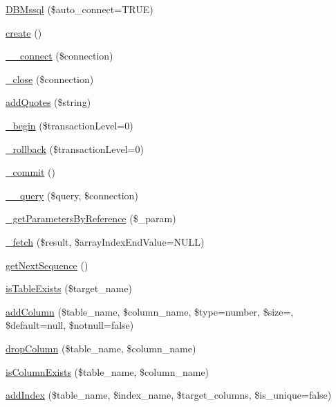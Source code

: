 \begin{DoxyCompactItemize}
\item 
\hyperlink{classDBMssql_ae74126db37fb85343806218896be4451}{D\+B\+Mssql} (\$auto\+\_\+connect=T\+R\+UE)
\item 
\hyperlink{classDBMssql_a1be3ce3432e43e0a5080ada450971345}{create} ()
\item 
\hyperlink{classDBMssql_a369f968ee79e1eb30e5d640c2294a7d1}{\+\_\+\+\_\+connect} (\$connection)
\item 
\hyperlink{classDBMssql_a64f2fc08d576cdcfc0dd3a80343a0e5a}{\+\_\+close} (\$connection)
\item 
\hyperlink{classDBMssql_ac380f1918abd17fd5cba28accfaec9fc}{add\+Quotes} (\$string)
\item 
\hyperlink{classDBMssql_ae44697dbc8dd678df78458a407e40c03}{\+\_\+begin} (\$transaction\+Level=0)
\item 
\hyperlink{classDBMssql_a35fd47dce4ad5dabbc3b994f5774afb7}{\+\_\+rollback} (\$transaction\+Level=0)
\item 
\hyperlink{classDBMssql_a08f359cc1c5ce91fde7139446252e8c4}{\+\_\+commit} ()
\item 
\hyperlink{classDBMssql_aa2d0d2f6680d70399f493b567d94ed92}{\+\_\+\+\_\+query} (\$query, \$connection)
\item 
\hyperlink{classDBMssql_a09c8011c16ac2e01c6fca9d6f0e6b7f6}{\+\_\+get\+Parameters\+By\+Reference} (\$\+\_\+param)
\item 
\hyperlink{classDBMssql_aed12cc502a2d8ee9ce8821af12d45b9e}{\+\_\+fetch} (\$result, \$array\+Index\+End\+Value=N\+U\+LL)
\item 
\hyperlink{classDBMssql_ad4342b7988253c6bbeec102b2c454659}{get\+Next\+Sequence} ()
\item 
\hyperlink{classDBMssql_add743e9c5148edf4f393209b1f4b9cd6}{is\+Table\+Exists} (\$target\+\_\+name)
\item 
\hyperlink{classDBMssql_af9ca9b154ba965d089216bbc72f39a34}{add\+Column} (\$table\+\_\+name, \$column\+\_\+name, \$type=\textquotesingle{}number\textquotesingle{}, \$size=\textquotesingle{}\textquotesingle{}, \$default=null, \$notnull=false)
\item 
\hyperlink{classDBMssql_a802707618ed283cd4143c82972b3ade5}{drop\+Column} (\$table\+\_\+name, \$column\+\_\+name)
\item 
\hyperlink{classDBMssql_a5a96979e7fed50503b902d2983fa507a}{is\+Column\+Exists} (\$table\+\_\+name, \$column\+\_\+name)
\item 
\hyperlink{classDBMssql_a6202a3b8e96252f91ef104a854cf556c}{add\+Index} (\$table\+\_\+name, \$index\+\_\+name, \$target\+\_\+columns, \$is\+\_\+unique=false)

\end{DoxyCompactItemize}
